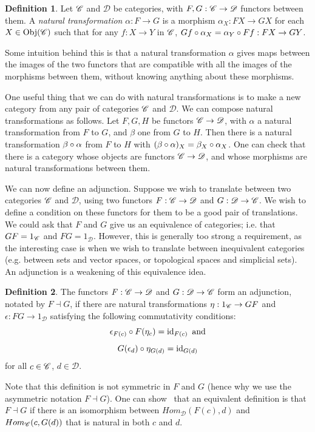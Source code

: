 \documentclass[a4paper,11pt,leqno]{article} \usepackage{amsmath}
\newcommand{\curD}{\mathscr{D}} \newcommand{\curI}{\mathscr{I}}
\newcommand{\id}{\ensuremath{\operatorname{id}}}
\newcommand{\Obj}{\ensuremath{\operatorname{Obj}}}
\theoremstyle{definition}
\newtheorem{defn}{Definition}
\begin{document}
\begin{defn}
  Let $\mathscr{C}$ and $\curD$ be categories, with $F, G: \curC\to \curD$ functors
  between them.
  A \emph{natural transformation} $\alpha: F\to G$ is a morphism
  $\alpha_X: FX\to GX$ for each $X\in \Obj(\curC)$ such that for any
  $f: X\to Y$ in $\mathscr{C}$, $Gf\circ \alpha_X = \alpha_Y\circ Ff: FX\to GY$.
\end{defn}

Some intuition behind this is that a natural transformation $\alpha$ gives maps
between the images of the two functors that are compatible with all the
images of the morphisms between them, without knowing anything about these
morphisms.

One useful thing that we can do with natural transformations is to make a new
category from any pair of categories $\mathscr{C}$ and $\curD$.
We can compose natural transformations as follows.
Let $F, G, H$ be functors $\curC\to \curD$, with $\alpha$ a natural
transformation from $F$ to $G$, and $\beta$ one from $G$ to $H$.
Then there is a natural transformation $\beta\circ\alpha$ from $F$ to $H$ with
$(\beta\circ\alpha)_X = \beta_X\circ\alpha_X$.
One can check that there is a category whose objects are functors
$\curC\to\curD$, and whose morphisms are natural transformations between them.

We can now define an adjunction.
Suppose we wish to translate between two categories $\mathscr{C}$ and $\curD$, using
two functors $F: \curC\to \curD$ and $G: \curD\to\curC$.
We wish to define a condition on these functors for them to be a good pair of
translations.
We could ask that $F$ and $G$ give us an equivalence of categories; i.e. that
$GF = 1_{\mathscr{C}}$ and $FG = 1_{\curD}$.
However, this is generally too strong a requirement, as the interesting case is
when we wish to translate between inequivalent categories (e.g. between sets
and vector spaces, or topological spaces and simplicial sets).
An adjunction is a weakening of this equivalence idea.

\begin{defn}
  The functors $F: \curC\to\curD$ and $G: \curD\to\curC$ form an adjunction,
  notated by $F\dashv G$, if there are natural transformations $\eta:
  1_{\mathscr{C}}\to GF$ and $\epsilon: FG\to 1_\curD$ satisfying the following
  commutativity conditions:
  $$\epsilon_{F(c)}\of F(\eta_c) = \id_{F(c)}\text{ and} $$
  $$G(\epsilon_d)\of \eta_{G(d)} = \id_{G(d)}$$
  for all $c\in\mathscr{C}$, $d\in\curD$.
\end{defn}

Note that this definition is not symmetric in $F$ and $G$ (hence why we use the
asymmetric notation $F\dashv G$).
One can show~\cite[Section 4]{Riehl} that an equivalent definition is that
$F\dashv G$ if there is an isomorphism between $Hom_\curD(F(c), d)$ and
$Hom_{\mathscr{C}}(c, G(d))$ that is natural in both $c$ and $d$.
\end{document}
